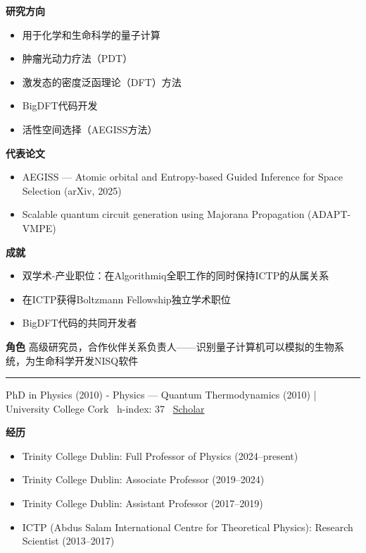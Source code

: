 \par{\footnotesize\color{mainred}\textbf{研究方向}}
\begin{itemize}[leftmargin=1.2em,itemsep=0pt,topsep=0pt]
\item {\footnotesize 用于化学和生命科学的量子计算}
\item {\footnotesize 肿瘤光动力疗法（PDT）}
\item {\footnotesize 激发态的密度泛函理论（DFT）方法}
\item {\footnotesize BigDFT代码开发}
\item {\footnotesize 活性空间选择（AEGISS方法）}
\end{itemize}
\par{\footnotesize\color{mainred}\textbf{代表论文}}
\begin{itemize}[leftmargin=1.2em,itemsep=0pt,topsep=0pt]
\item {\footnotesize AEGISS — Atomic orbital and Entropy-based Guided Inference for Space Selection (arXiv, 2025)}
\item {\footnotesize Scalable quantum circuit generation using Majorana Propagation (ADAPT-VMPE)}
\end{itemize}
\par{\footnotesize\color{mainred}\textbf{成就}}
\begin{itemize}[leftmargin=1.2em,itemsep=0pt,topsep=0pt]
\item {\footnotesize 双学术-产业职位：在Algorithmiq全职工作的同时保持ICTP的从属关系}
\item {\footnotesize 在ICTP获得Boltzmann Fellowship独立学术职位}
\item {\footnotesize BigDFT代码的共同开发者}
\end{itemize}
\par{\footnotesize\color{mainred}\textbf{角色}} {\footnotesize 高级研究员，合作伙伴关系负责人——识别量子计算机可以模拟的生物系统，为生命科学开发NISQ软件}
\vspace{2pt}\hrule\vspace{2pt}
\vspace{4pt}
\par{\footnotesize\color{graytext}PhD in Physics (2010) - Physics — Quantum Thermodynamics (2010) | University College Cork \textbar\  h-index: 37 \textbar\  \href{https://scholar.google.com/citations?user=uPtQT_sAAAAJ}{Scholar}}
\par{\footnotesize\color{mainred}\textbf{经历}}
\begin{itemize}[leftmargin=1.2em,itemsep=0pt,topsep=0pt]
\item {\footnotesize Trinity College Dublin: Full Professor of Physics (2024–present)}
\item {\footnotesize Trinity College Dublin: Associate Professor (2019–2024)}
\item {\footnotesize Trinity College Dublin: Assistant Professor (2017–2019)}
\item {\footnotesize ICTP (Abdus Salam International Centre for Theoretical Physics): Research Scientist (2013–2017)}
\end{itemize}
